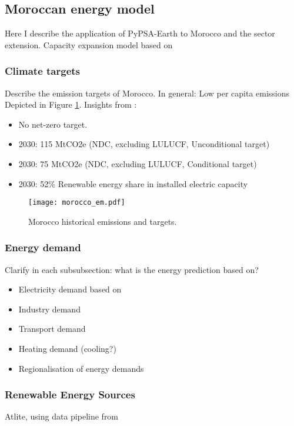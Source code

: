 
\subsection{Moroccan energy model}
\label{subsec:moroccan_model}
Here I describe the application of PyPSA-Earth \cite{Parzen2022} to Morocco and the sector extension.
Capacity expansion model based on \cite{Brown2018}


\subsubsection{Climate targets}
Describe the emission targets of Morocco. In general: Low per capita emissions
Depicted in Figure \ref{fig:morocco_em}.
Insights from \cite{CAT2021}:
\begin{itemize}
    \item No net-zero target.
    \item 2030: 115 MtCO2e (NDC, excluding LULUCF, Unconditional target)
    \item 2030: 75 MtCO2e (NDC, excluding LULUCF, Conditional target)
    \item 2030: 52\% Renewable energy share in installed electric capacity
\end{itemize}

\begin{figure}[h!]
    \centering
    \texttt{[image: morocco\_em.pdf]}
    \caption{Morocco historical emissions and targets.}
    \label{fig:morocco_em}
\end{figure}


\subsubsection{Energy demand}
Clarify in each subsubsection: what is the energy prediction based on?
\begin{itemize}
    \item Electricity demand based on \cite{Parzen2022}
    \item Industry demand
    \item Transport demand
    \item Heating demand (cooling?) 
    \item Regionalisation of energy demands
\end{itemize}


\subsubsection{Renewable Energy Sources}
Atlite, using data pipeline from \cite{Parzen2022}


